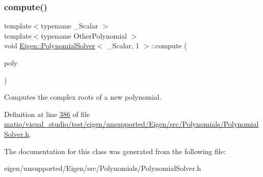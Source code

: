 \subsubsection{\texorpdfstring{compute()}{compute()}\hspace{0.1cm}{\footnotesize\ttfamily [2/2]}}
{\footnotesize\ttfamily template$<$typename \+\_\+\+Scalar $>$ \\
template$<$typename Other\+Polynomial $>$ \\
void \hyperlink{class_eigen_1_1_polynomial_solver}{Eigen\+::\+Polynomial\+Solver}$<$ \+\_\+\+Scalar, 1 $>$\+::compute (\begin{DoxyParamCaption}\item[{const Other\+Polynomial \&}]{poly }\end{DoxyParamCaption})\hspace{0.3cm}{\ttfamily [inline]}}

Computes the complex roots of a new polynomial. 

Definition at line \hyperlink{matio_2visual__studio_2test_2eigen_2unsupported_2_eigen_2src_2_polynomials_2_polynomial_solver_8h_source_l00386}{386} of file \hyperlink{matio_2visual__studio_2test_2eigen_2unsupported_2_eigen_2src_2_polynomials_2_polynomial_solver_8h_source}{matio/visual\+\_\+studio/test/eigen/unsupported/\+Eigen/src/\+Polynomials/\+Polynomial\+Solver.\+h}.



The documentation for this class was generated from the following file\+:\begin{DoxyCompactItemize}
\item 
eigen/unsupported/\+Eigen/src/\+Polynomials/\+Polynomial\+Solver.\+h\end{DoxyCompactItemize}
